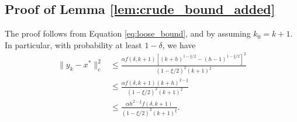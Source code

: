 \documentclass[letterpaper, 10 pt]{article}
\begin{document}
\subsection{Proof of Lemma \ref{lem:crude_bound_added}} \label{proof:crude_bound_added}
    The proof follows from Equation \eqref{eq:loose_bound}, and by assuming $k_0=k+1$. In particular, with probability at least $1-\delta$, we have
    \begin{align}
    \|y_k-x^*\|_c^2&\leq \frac{\alpha f(\delta,k+1)\left[(k+h)^{1-\xi/2}-(h-1)^{1-\xi/2}\right]^2}{(1-\xi/2)^2(k+1)^{2}}\nonumber\\
    &\leq \frac{\alpha f(\delta,k+1)(k+h)^{2-\xi}}{(1-\xi/2)^2(k+1)^{2}}\nonumber\\
    &\leq \frac{\alpha h^{2-\xi} f(\delta,k+1)}{(1-\xi/2)^2(k+1)^{\xi}}.\nonumber
\end{align}
\end{document}

